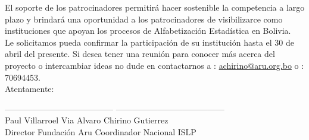 \documentclass[11pt,a4paper]{article}
\begin{document}
El soporte de los patrocinadores permitirá hacer sostenible la competencia a largo plazo y brindará una oportunidad a los patrocinadores de visibilizarce como instituciones que apoyan los procesos de Alfabetización Estadística en Bolivia. \\

Le solicitamos pueda confirmar la participación de su institución hasta el 30 de abril del presente. Si desea tener una reunión para conocer más acerca del proyecto o intercambiar ideas no dude en contactarnos a \faEnvelopeO: \url{achirino@aru.org.bo} o  \faPhone: 70694453.\\

Atentamente:


\begin{center}
\vspace{1.6cm}
---------------------------------------\hspace{0.5cm} ---------------------------------------\\
\noindent \hspace{0.2cm}Paul Villarroel Via \hspace{2.7cm}				Alvaro Chirino Gutierrez\\
\hspace{0.5cm}Director Fundación Aru \hspace{1.7cm}	Coordinador Nacional ISLP

\end{center}
\end{document}
